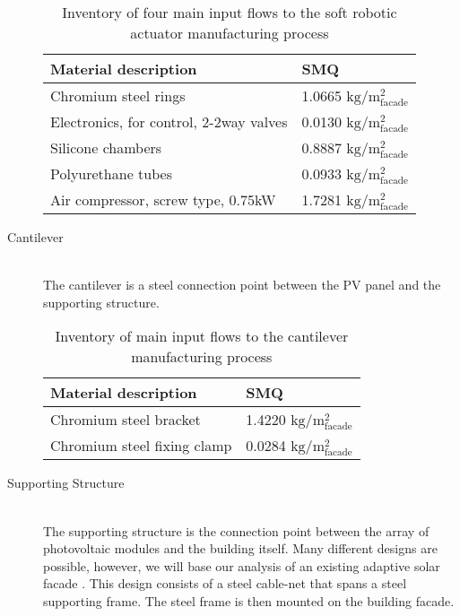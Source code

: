 \begin{description}
\begin{table}[H]
\centering
\begin{tabular}{ll}
\hline
Material description & SMQ \\ \hline
Chromium steel rings	 & 1.0665 ${\mathrm{kg/m^2_{facade}}}$ \\
Electronics, for control, 2-2way valves  & 0.0130  ${\mathrm{kg/m^2_{facade}}}$\\
Silicone chambers & 0.8887 ${\mathrm{kg/m^2_{facade}}}$\\
Polyurethane tubes &0.0933 ${\mathrm{kg/m^2_{facade}}}$\\
Air compressor, screw type, 0.75kW & 1.7281 ${\mathrm{kg/m^2_{facade}}}$\\
\hline
\end{tabular}
\caption{Inventory of four main input flows to the soft robotic actuator manufacturing process }
\label{tab:ActuatorInv}
\end{table}

\item[Cantilever] \hfill \\
The cantilever is a steel connection point between the PV panel and the supporting structure.\\

\begin{table}[H]
\centering
\begin{tabular}{ll}
\hline
Material description & SMQ \\ \hline
Chromium steel bracket	 & 1.4220 ${\mathrm{kg/m^2_{facade}}}$ \\
Chromium steel fixing clamp  & 0.0284 ${\mathrm{kg/m^2_{facade}}}$\\
\hline
\end{tabular}
\caption{Inventory of main input flows to the cantilever manufacturing process }
\label{tab:CantileverInv}
\end{table}

\item[Supporting Structure] \hfill \\
The supporting structure is the connection point between the array of photovoltaic modules and the building itself. Many different designs are possible, however, we will base our analysis of an existing adaptive solar facade \cite{nagy2016adaptive}. This design consists of a steel cable-net that spans a steel supporting frame. The steel frame is then mounted on the building facade.\\


\end{description}

